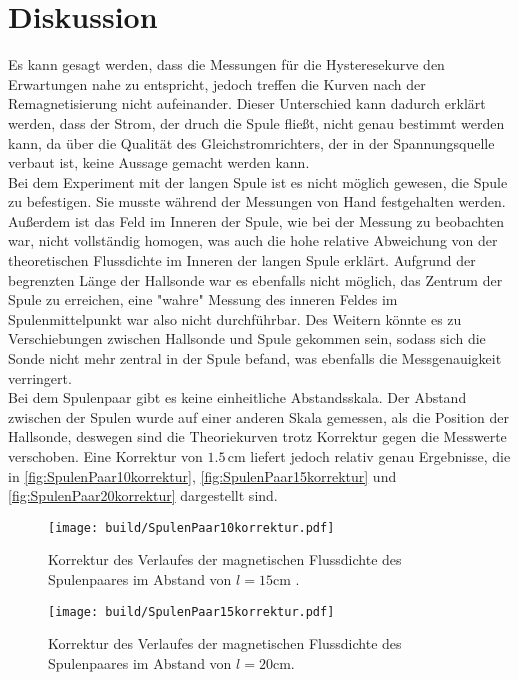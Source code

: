 \section{Diskussion}
\label{sec:Diskussion}
Es kann gesagt werden, dass die Messungen für die Hysteresekurve den Erwartungen nahe zu entspricht, jedoch treffen die Kurven nach der Remagnetisierung nicht aufeinander. 
Dieser Unterschied kann dadurch erklärt werden, dass der Strom, der druch die Spule fließt, nicht genau bestimmt werden kann, da über die Qualität des Gleichstromrichters,
 der in der Spannungsquelle verbaut ist, keine Aussage gemacht werden kann.\\

Bei dem Experiment mit der langen Spule ist es nicht möglich gewesen, die Spule zu befestigen. 
Sie musste während der Messungen von Hand festgehalten werden. 
Außerdem ist das Feld im Inneren der Spule, wie bei der Messung zu beobachten war, nicht vollständig homogen, was auch die hohe relative Abweichung von der theoretischen Flussdichte im Inneren der langen Spule erklärt.
Aufgrund der begrenzten Länge der Hallsonde war es ebenfalls nicht möglich, das Zentrum der Spule zu erreichen, eine "wahre" Messung des inneren Feldes im Spulenmittelpunkt war also nicht durchführbar.
Des Weitern könnte es zu Verschiebungen zwischen Hallsonde und Spule gekommen sein, sodass sich die Sonde nicht mehr zentral in der Spule befand, was ebenfalls die Messgenauigkeit verringert.\\

Bei dem Spulenpaar gibt es keine einheitliche Abstandsskala.
Der Abstand zwischen der Spulen wurde auf einer anderen Skala gemessen, als die Position der Hallsonde, deswegen sind die Theoriekurven trotz Korrektur gegen die Messwerte verschoben.
Eine Korrektur von  $1.5 \, \unit{\centi\meter}$ liefert jedoch relativ genau Ergebnisse, die in \autoref{fig:SpulenPaar10korrektur}, \autoref{fig:SpulenPaar15korrektur} und \autoref{fig:SpulenPaar20korrektur}
dargestellt sind.

\begin{figure}[H]
    \centering
    \texttt{[image: build/SpulenPaar10korrektur.pdf]}
    \caption{Korrektur des Verlaufes der magnetischen Flussdichte des Spulenpaares im Abstand von $l = 15 \unit{\centi\meter}$ .}
    \label{fig:SpulenPaar10korrektur}
  \end{figure}

  \begin{figure}[H]
    \centering
    \texttt{[image: build/SpulenPaar15korrektur.pdf]}
    \caption{Korrektur des Verlaufes der magnetischen Flussdichte des Spulenpaares im Abstand von $l = 20 \unit{\centi\meter}$.}
    \label{fig:SpulenPaar15korrektur}
  \end{figure}

